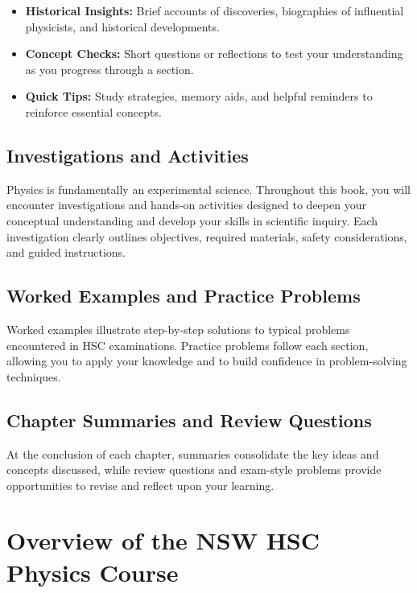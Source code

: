 \begin{itemize}
\item \textbf{Historical Insights:} Brief accounts of discoveries, biographies of influential physicists, and historical developments.
\item \textbf{Concept Checks:} Short questions or reflections to test your understanding as you progress through a section.
\item \textbf{Quick Tips:} Study strategies, memory aids, and helpful reminders to reinforce essential concepts.
\end{itemize}

\subsection{Investigations and Activities}
\FloatBarrier

Physics is fundamentally an experimental science. Throughout this book, you will encounter investigations and hands-on activities designed to deepen your conceptual understanding and develop your skills in scientific inquiry. Each investigation clearly outlines objectives, required materials, safety considerations, and guided instructions. 

\subsection{Worked Examples and Practice Problems}
\FloatBarrier

Worked examples illustrate step-by-step solutions to typical problems encountered in HSC examinations. Practice problems follow each section, allowing you to apply your knowledge and to build confidence in problem-solving techniques.

\subsection{Chapter Summaries and Review Questions}
\FloatBarrier

At the conclusion of each chapter, summaries consolidate the key ideas and concepts discussed, while review questions and exam-style problems provide opportunities to revise and reflect upon your learning.

\section{Overview of the NSW HSC Physics Course}
\FloatBarrier

